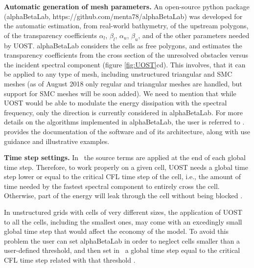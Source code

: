 \textbf{Automatic generation of mesh parameters.} 
An open-source python package (alphaBetaLab, https://github.com/menta78/alphaBetaLab) 
was developed
for the automatic estimation, from real-world bathymetry, of the upstream polygons, 
of the transparency coefficients
$\alpha_l$, $\beta_l$, $\alpha_u$, $\beta_u$,
and of the other parameters needed by UOST.
alphaBetaLab considers the cells as free polygons, and estimates the transparency coefficients
from the cross section of the unresolved obstacles versus the incident spectral component 
(figure \ref{fig:UOST}cd).
This involves, that it can be applied to any type of mesh, 
including unstructured triangular and SMC meshes 
(as of August 2018 only regular and triangular meshes are handled, 
but support for SMC meshes 
will be soon added). 
We need to mention that while UOST would be able to modulate the energy dissipation 
with the spectral frequency, only the direction is currently considered in alphaBetaLab.
For more details on the algorithms implemented in alphaBetaLab, 
the user is referred to \cite{art:Mentaschi2018a}. 
\cite{art:Mentaschi2018c} provides the documentation of the software and of its architecture,
along with use guidance and illustrative examples. 

\textbf{Time step settings.} 
In \ws\ the source terms are applied at the end of each global time step.
Therefore, to work properly on a given cell, 
UOST needs a global time step lower
or equal to the critical CFL time step of the cell, 
i.e., the amount of time needed by the fastest spectral component to entirely cross the cell.
Otherwise, part of the energy will leak through the cell without being blocked \citep{art:Mentaschi2018a}.

In unstructured grids with cells of very different sizes, the application of UOST to 
all the cells, including the smallest ones, may come with an excedingly small global time step
that would affect the economy of the model. 
To avoid this problem the user can set alphaBetaLab in order to
neglect cells smaller than a user-defined threshold, and then set in \ws\
a global time step equal to the critical CFL time step related with that threshold 
\citep{art:Mentaschi2018c}.


